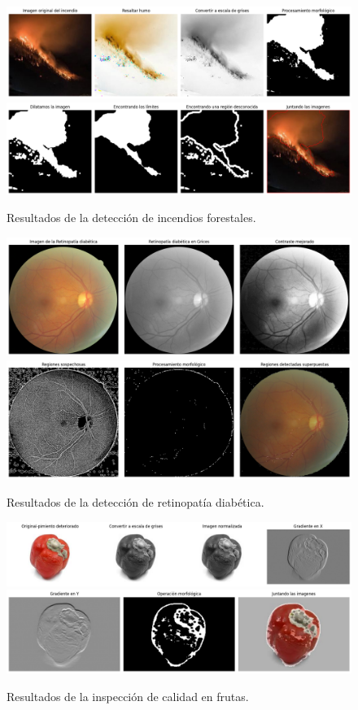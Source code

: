 



\begin{figure}[t]
    \centering
    \includegraphics[height=0.15\textwidth]{./figures/drive/incendio.png}
    \includegraphics[height=0.15\textwidth]{./figures/drive/incendio_2.png}
    \caption{Resultados de la detección de incendios forestales.}
    \label{fig:incendio_results}
\end{figure}

\begin{figure}[t]
    \centering
    \includegraphics[height=0.15\textwidth]{./figures/drive/ojos.png}
    \includegraphics[height=0.15\textwidth]{./figures/drive/ojos_2.png}
    \caption{Resultados de la detección de retinopatía diabética.}
    \label{fig:retinopatia_results}
\end{figure}

\begin{figure}[t]
    \centering
    \includegraphics[height=0.15\textwidth]{./figures/drive/frutas.png}
    \includegraphics[height=0.15\textwidth]{./figures/drive/frutas_2.png}
    \caption{Resultados de la inspección de calidad en frutas.}
    \label{fig:frutas_results}
\end{figure}

